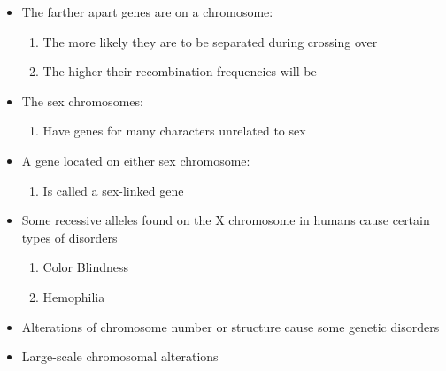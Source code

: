 \documentclass[12pt]{article}
\begin{document}
\begin{itemize}
\begin{enumerate}
    \end{enumerate}

  \item The farther apart genes are on a chromosome:

    \begin{enumerate}

      \item The more likely they are to be separated during crossing over

      \item The higher their recombination frequencies will be

    \end{enumerate}

  \item The sex chromosomes:

    \begin{enumerate}

      \item Have genes for many characters unrelated to sex

    \end{enumerate}

  \item A gene located on either sex chromosome:

    \begin{enumerate}

      \item Is called a sex-linked gene

    \end{enumerate}

  \item Some recessive alleles found on the X chromosome in humans cause certain types of disorders

    \begin{enumerate}

      \item Color Blindness
        
      \item Hemophilia

    \end{enumerate}

  \item Alterations of chromosome number or structure cause some genetic disorders

  \item Large-scale chromosomal alterations

    \begin{enumerate}


\end{enumerate}
\end{itemize}
\end{document}
